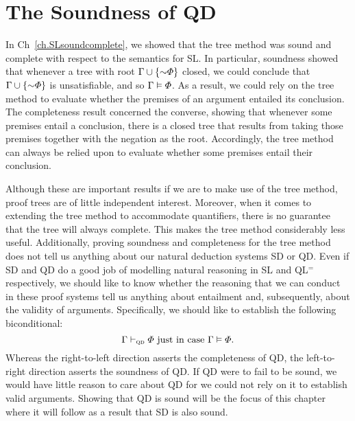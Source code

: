 ﻿%
\chapter{The Soundness of QD}
  \label{ch.SoundQD}


In Ch~\ref{ch.SLsoundcomplete}, we showed that the tree method was sound and complete with respect to the semantics for SL.
In particular, soundness showed that whenever a tree with root $\Gamma\cup\set{\enot\metaA}$ closed, we could conclude that $\Gamma\cup\set{\enot\metaA}$ is unsatisfiable, and so $\Gamma \vDash \varPhi$.
As a result, we could rely on the tree method to evaluate whether the premises of an argument entailed its conclusion.
The completeness result concerned the converse, showing that whenever some premises entail a conclusion, there is a closed tree that results from taking those premises together with the negation as the root.
Accordingly, the tree method can always be relied upon to evaluate whether some premises entail their conclusion.

Although these are important results if we are to make use of the tree method, proof trees are of little independent interest.
Moreover, when it comes to extending the tree method to accommodate quantifiers, there is no guarantee that the tree will always complete.
This makes the tree method considerably less useful.
Additionally, proving soundness and completeness for the tree method does not tell us anything about our natural deduction systems SD or QD.
Even if SD and QD do a good job of modelling natural reasoning in SL and QL$^=$ respectively, we should like to know whether the reasoning that we can conduct in these proof systems tell us anything about entailment and, subsequently, about the validity of arguments.
Specifically, we should like to establish the following biconditional: 
  $$\Gamma \vdash_{\textsc{qd}} \varPhi \text{ just in case } \Gamma \vDash \varPhi.$$
Whereas the right-to-left direction asserts the completeness of QD, the left-to-right direction asserts the soundness of QD.
If QD were to fail to be sound, we would have little reason to care about QD for we could not rely on it to establish valid arguments.
Showing that QD is sound will be the focus of this chapter where it will follow as a result that SD is also sound.

